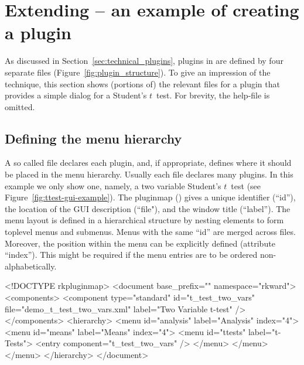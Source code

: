 \section[Extending RKWard -- an example of creating a plugin]{Extending  -- an example of creating a plugin}
\label{sec:example_plugin}
As discussed in Section~\ref{sec:technical_plugins}, plugins in  are
defined by four separate files (Figure~\ref{fig:plugin_structure}). To give an impression of the technique,
this section shows (portions of) the relevant files for a plugin that provides
a simple dialog for a Student's $t$~test. For brevity, the help-file is omitted.

\subsection{Defining the menu hierarchy}
\label{sec:defining_menu_hierarchy}
A so called  file declares each plugin, and, if appropriate, defines where it should
be placed in the menu hierarchy. Usually each  file declares many plugins. In this example
we only show one, namely, a two variable Student's $t$~test (see Figure~\ref{fig:ttest-gui-example}). 
The pluginmap () gives a unique identifier (``id''), the location of the
GUI description (``file"), and the window title (``label''). The menu layout is defined in a hierarchical
structure by nesting  elements to form toplevel menus and submenus. Menus with the same ``id''
are merged across  files. Moreover, the position within the menu can be explicitly defined (attribute ``index'').
This might be required if the menu entries are to be ordered non-alphabetically.

\begin{footnotesize}
\begin{Code}
<!DOCTYPE rkpluginmap>
<document base_prefix="" namespace="rkward">
  <components>
    <component type="standard" id="t_test_two_vars"
          file="demo_t_test_two_vars.xml" label="Two Variable t-test" />
  </components>
  <hierarchy>
    <menu id="analysis" label="Analysis" index="4">
      <menu id="means" label="Means" index="4">
        <menu id="ttests" label="t-Tests">
          <entry component="t_test_two_vars" />
        </menu>
      </menu>
    </menu>
  </hierarchy>
</document>
\end{Code}
\end{footnotesize}


